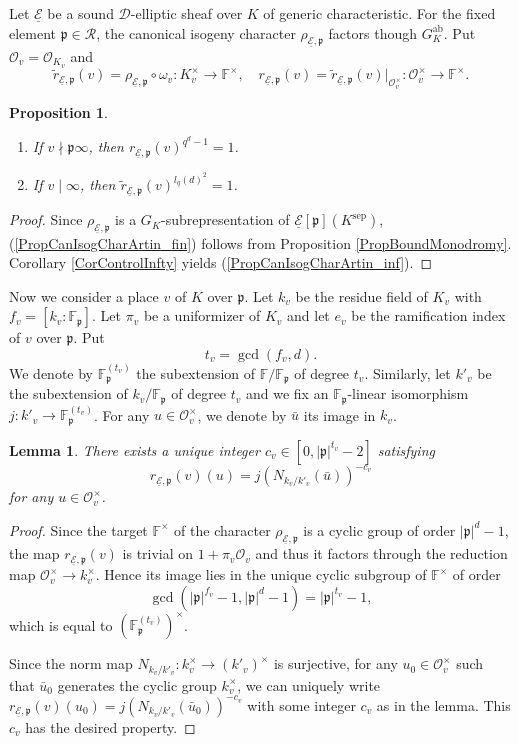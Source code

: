 \documentclass[10pt]{amsart}
\theoremstyle{plain}
\newtheorem{prop}[thm]{Proposition}
\newtheorem{lem}[thm]{Lemma}
\theoremstyle{definition}
\newcommand{\ab}{\mathrm{ab}}
\newcommand{\sep}{\mathrm{sep}}
\newcommand{\cO}{\mathcal{O}}
\newcommand{\cR}{\mathcal{R}}
\newcommand{\ucE}{\underline{\mathcal{E}}}
\newcommand{\bF}{\mathbb{F}}
\newcommand{\sD}{\mathscr{D}}
\newcommand{\frp}{\mathfrak{p}}
\begin{document}
Let $\ucE$ be a sound $\sD$-elliptic sheaf over $K$ of generic characteristic. 
For the fixed element $\frp\in \cR$, the canonical isogeny character
$\rho_{\ucE,\frp}$ factors though $G_K^\ab$.
Put $\cO_v=\cO_{K_v}$ and
\[
\tilde{r}_{\ucE,\frp}(v)=\rho_{\ucE,\frp}\circ \omega_v: K_v^\times\to \bF^\times,\quad 
r_{\ucE,\frp}(v)=\tilde{r}_{\ucE,\frp}(v)|_{\cO_v^\times}: \cO_v^\times\to \bF^\times.
\]


\begin{prop}\label{PropCanIsogCharArtin}
	\begin{enumerate}
		\item\label{PropCanIsogCharArtin_fin} If $v\nmid \frp\infty$, then $r_{\ucE,\frp}(v)^{q^d-1}=1$.
		\item\label{PropCanIsogCharArtin_inf} 
		If $v\mid\infty$, then $\tilde{r}_{\ucE,\frp}(v)^{l_q(d)^2}=1$.
	\end{enumerate}
\end{prop}
\begin{proof}
	Since $\rho_{\ucE,\frp}$ is a $G_K$-subrepresentation of $\ucE[\frp](K^\sep)$,
	(\ref{PropCanIsogCharArtin_fin}) follows from Proposition \ref{PropBoundMonodromy}.
	Corollary \ref{CorControlInfty} yields (\ref{PropCanIsogCharArtin_inf}).
\end{proof}

Now we consider a place $v$ of $K$ over $\frp$. Let $k_v$ be the residue field of $K_v$ with $f_v=[k_v:\bF_\frp]$.
Let $\pi_v$ be a uniformizer of $K_v$ and let $e_v$ be the ramification index of $v$ over $\frp$. Put
\[
t_v=\gcd(f_v,d).
\]
We denote by $\bF_{\frp}^{(t_v)}$ the subextension of $\bF/\bF_\frp$ of degree $t_v$.
Similarly, let $k'_v$ be the subextension of $k_v/\bF_\frp$ of degree $t_v$ and 
we fix an $\bF_\frp$-linear isomorphism $j:k'_v\to \bF_\frp^{(t_v)}$.
For any $u\in \cO_v^\times$, we denote by $\bar{u}$ its image in $k_v$.

\begin{lem}\label{LemDefCv}
	There exists a unique integer $c_v\in [0,|\frp|^{t_v}-2]$ satisfying
	\[
	r_{\ucE,\frp}(v)(u)=j(N_{k_v/k'_v}(\bar{u}))^{-c_v}
	\]
	for any $u\in \cO_v^\times$.
\end{lem}
\begin{proof}
	Since the target $\bF^\times$ of the character $\rho_{\ucE,\frp}$ is a cyclic group of order $|\frp|^d-1$,
	the map $r_{\ucE,\frp}(v)$ is trivial on $1+\pi_v \cO_v$ and thus it factors through the reduction map
	$\cO_v^\times\to k_v^\times$.
	Hence its image lies in the unique cyclic subgroup of $\bF^\times$ of order
	\[
	\gcd(|\frp|^{f_v}-1,|\frp|^d-1)=|\frp|^{t_v}-1,
	\]
	which is equal to $(\bF_\frp^{(t_v)})^\times$.
	
	Since the norm map $N_{k_v/k'_v}:k_v^\times\to(k'_v)^\times$ is surjective, 
	for any $u_0\in \cO_v^\times$ such that $\bar{u}_0$ 
	generates the cyclic group
	$k_v^\times$, we can uniquely write $r_{\ucE,\frp}(v)(u_0)=j(N_{k_v/k'_v}(\bar{u}_0))^{-c_v}$ with some integer $c_v$ as in the lemma.
	This $c_v$ has the desired property.
\end{proof}
\end{document}
